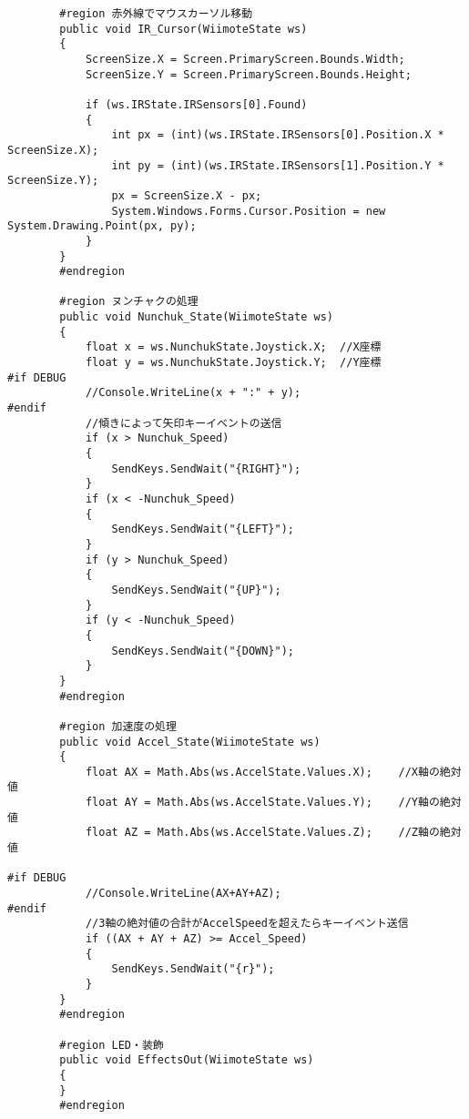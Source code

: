 \begin{verbatim}
        #region 赤外線でマウスカーソル移動
        public void IR_Cursor(WiimoteState ws)
        {
            ScreenSize.X = Screen.PrimaryScreen.Bounds.Width;
            ScreenSize.Y = Screen.PrimaryScreen.Bounds.Height;

            if (ws.IRState.IRSensors[0].Found)
            {
                int px = (int)(ws.IRState.IRSensors[0].Position.X * ScreenSize.X);
                int py = (int)(ws.IRState.IRSensors[1].Position.Y * ScreenSize.Y);
                px = ScreenSize.X - px;
                System.Windows.Forms.Cursor.Position = new System.Drawing.Point(px, py);
            }
        }
        #endregion

        #region ヌンチャクの処理
        public void Nunchuk_State(WiimoteState ws)
        {
            float x = ws.NunchukState.Joystick.X;  //X座標
            float y = ws.NunchukState.Joystick.Y;  //Y座標
#if DEBUG
            //Console.WriteLine(x + ":" + y);
#endif
            //傾きによって矢印キーイベントの送信
            if (x > Nunchuk_Speed)
            {
                SendKeys.SendWait("{RIGHT}");
            }
            if (x < -Nunchuk_Speed)
            {
                SendKeys.SendWait("{LEFT}");
            }
            if (y > Nunchuk_Speed)
            {
                SendKeys.SendWait("{UP}");
            }
            if (y < -Nunchuk_Speed)
            {
                SendKeys.SendWait("{DOWN}");
            }
        }
        #endregion

        #region 加速度の処理
        public void Accel_State(WiimoteState ws)
        {
            float AX = Math.Abs(ws.AccelState.Values.X);    //X軸の絶対値
            float AY = Math.Abs(ws.AccelState.Values.Y);    //Y軸の絶対値
            float AZ = Math.Abs(ws.AccelState.Values.Z);    //Z軸の絶対値

#if DEBUG
            //Console.WriteLine(AX+AY+AZ);
#endif
            //3軸の絶対値の合計がAccelSpeedを超えたらキーイベント送信
            if ((AX + AY + AZ) >= Accel_Speed)
            {
                SendKeys.SendWait("{r}");
            }
        }
        #endregion

        #region LED・装飾
        public void EffectsOut(WiimoteState ws)
        {
        }
        #endregion


\end{verbatim}
